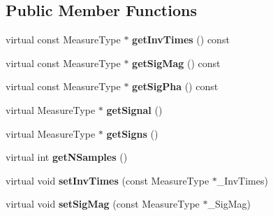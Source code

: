 \subsection*{Public Member Functions}
\begin{DoxyCompactItemize}
\item 
\hypertarget{class_ox_1_1_sign_calculator_aeae2b269b870b515f9da0ecb9a0c9dda}{virtual const Measure\-Type $\ast$ {\bfseries get\-Inv\-Times} () const }\label{class_ox_1_1_sign_calculator_aeae2b269b870b515f9da0ecb9a0c9dda}

\item 
\hypertarget{class_ox_1_1_sign_calculator_abe5cfb287faab9e06e113bf33daa9b2e}{virtual const Measure\-Type $\ast$ {\bfseries get\-Sig\-Mag} () const }\label{class_ox_1_1_sign_calculator_abe5cfb287faab9e06e113bf33daa9b2e}

\item 
\hypertarget{class_ox_1_1_sign_calculator_a5d875d51f77739c61d8c6391d665ade9}{virtual const Measure\-Type $\ast$ {\bfseries get\-Sig\-Pha} () const }\label{class_ox_1_1_sign_calculator_a5d875d51f77739c61d8c6391d665ade9}

\item 
\hypertarget{class_ox_1_1_sign_calculator_ac4dc2ae5e3e5eee88d0a3a347a68a637}{virtual Measure\-Type $\ast$ {\bfseries get\-Signal} ()}\label{class_ox_1_1_sign_calculator_ac4dc2ae5e3e5eee88d0a3a347a68a637}

\item 
\hypertarget{class_ox_1_1_sign_calculator_a04d65630c95cf94ee6198193a5c0c346}{virtual Measure\-Type $\ast$ {\bfseries get\-Signs} ()}\label{class_ox_1_1_sign_calculator_a04d65630c95cf94ee6198193a5c0c346}

\item 
\hypertarget{class_ox_1_1_sign_calculator_a6f1f77383cd088a1339ae91ce0b58e40}{virtual int {\bfseries get\-N\-Samples} ()}\label{class_ox_1_1_sign_calculator_a6f1f77383cd088a1339ae91ce0b58e40}

\item 
\hypertarget{class_ox_1_1_sign_calculator_a184b9d2bd4b6677fef960aef40dbfe1c}{virtual void {\bfseries set\-Inv\-Times} (const Measure\-Type $\ast$\-\_\-\-Inv\-Times)}\label{class_ox_1_1_sign_calculator_a184b9d2bd4b6677fef960aef40dbfe1c}

\item 
\hypertarget{class_ox_1_1_sign_calculator_ad010dcfd41f343b7d9cad99a3c628468}{virtual void {\bfseries set\-Sig\-Mag} (const Measure\-Type $\ast$\-\_\-\-Sig\-Mag)}\label{class_ox_1_1_sign_calculator_ad010dcfd41f343b7d9cad99a3c628468}


\end{DoxyCompactItemize}
